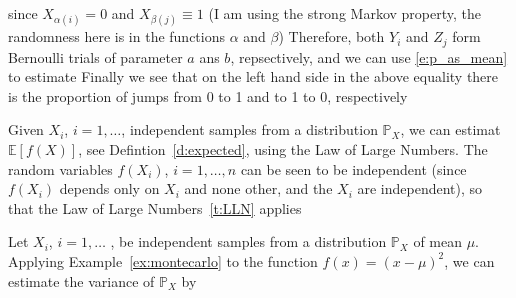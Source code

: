 \begin{example}
	since $X_{\alpha(i) } = 0$ and $X_{\beta(j)}\equiv 1$ (I am using the strong Markov property, the randomness here is in the functions $\alpha$ and $\beta$)
	Therefore, both $Y_i$ and $Z_j$ form Bernoulli trials of parameter $a$ ans $b$, repsectively, and we can use \eqref{e:p_as_mean} to estimate
	Finally we see that on the left hand side in the above equality there is the proportion of jumps from 0 to 1 and to 1 to 0, respectively 
	\end{example}
	

	
	\begin{example}[Montecarlo]
		\label{ex:montecarlo}
		Given $X_i$, $i = 1, \ldots$, independent samples from a distribution $\mathbb P_X$, we can estimat $\mathbb E[f(X)]$, see Defintion~\ref{d:expected}, using the Law of Large Numbers. The random variables $f(X_i)$, $i =1, \ldots, n$ can be seen to be independent (since $f(X_i)$ depends only on $X_i$ and none other, and the $X_i$ are independent), so that the Law of Large Numbers~\ref{t:LLN} applies
	\end{example}
	\begin{example}
		\label{ex:montecarlo_variance}
		Let $X_i$, $i = 1, \ldots$ , be independent samples from a distribution $\mathbb P_X$ of mean $\mu$. Applying Example~\ref{ex:montecarlo} to the function $f(x) = (x - \mu)^2$, we can estimate the variance of $\mathbb P_X$ by   
	\end{example}

